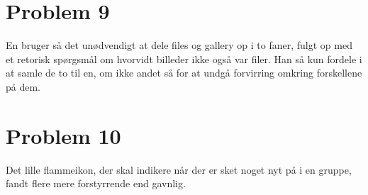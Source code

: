 \documentclass[12pt]{article}
\begin{document}
\section*{Problem 9}
En bruger så det unødvendigt at dele files og gallery op i to faner, fulgt op med et
retorisk spørgsmål om hvorvidt billeder ikke også var filer. Han så kun fordele i at
samle de to til en, om ikke andet så for at undgå forvirring omkring forskellene på
dem.
\newpage
\section*{Problem 10}
Det lille flammeikon, der skal indikere når der er sket noget nyt på i en gruppe,
fandt flere mere forstyrrende end gavnlig.
\end{document}
